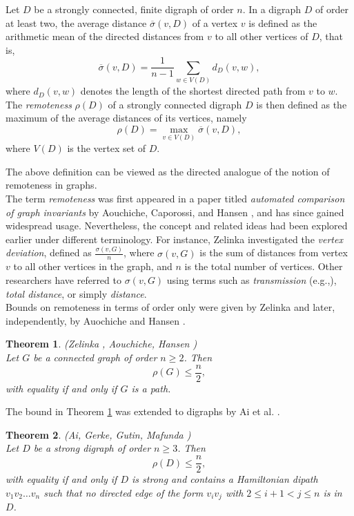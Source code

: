 \documentclass[a4paper,11pt]{article}
\newtheorem{theorem}{Theorem}[section]
\begin{document}
Let $D$ be a strongly connected, finite digraph of order $n$. In a digraph $D$ of order at least two, the average distance $\overline{\sigma}(v, D)$ of a vertex $v$ is defined as the arithmetic mean of the directed distances from $v$ to all other vertices of $D$, that is,
\[
\overline{\sigma}(v, D) = \frac{1}{n-1} \sum_{w \in V(D)} d_D(v, w),
\]
where $d_D(v, w)$ denotes the length of the shortest directed path from $v$ to $w$.  
The \emph{remoteness} $\rho(D)$ of a strongly connected digraph $D$ is then defined as the maximum of the average distances of its vertices, namely
\[
\rho(D) = \max_{v \in V(D)} \overline{\sigma}(v, D),
\]
where $V(D)$ is the vertex set of $D$.  

\medskip
The above definition can be viewed as the directed analogue of the notion of remoteness in graphs.\\


The term \emph{remoteness} was first appeared in a paper titled \emph{automated comparison of graph invariants} by Aouchiche, Caporossi, and Hansen \cite{AouCapHan2007}, and has since gained widespread usage. Nevertheless, the concept and related ideas had been explored earlier under different terminology. For instance, Zelinka \cite{Zel1968} investigated the \emph{vertex deviation}, defined as $\frac{\sigma(v, G)}{n}$, where $\sigma(v, G)$ is the sum of distances from vertex $v$ to all other vertices in the graph, and $n$ is the total number of vertices. Other researchers have referred to $\sigma(v, G)$ using terms such as \emph{transmission} (e.g.,\cite{Ple1984}), \emph{total distance}, or simply \emph{distance}.\\



Bounds on remoteness in terms of order only were given by Zelinka \cite{Zel1968} and later, independently, by Auochiche and Hansen \cite{AouHan2011}. 

\begin{theorem}\label{Zel1968AouHan2011}
{\rm (Zelinka \cite{Zel1968}, Aouchiche, Hansen \cite{AouHan2011})} \\
Let $G$ be a connected graph of order $n\geq 2$. Then
\[ \rho(G) \leq \frac{n}{2}, \]
with equality if and only if $G$ is a path.
\end{theorem}

The bound in Theorem \ref{Zel1968AouHan2011} was extended to digraphs by Ai et al. \cite{AiGerGutMaf2021}.

\begin{theorem}\label{AiGerGutMaf2021}
{\rm (Ai, Gerke, Gutin, Mafunda \cite{AiGerGutMaf2021})}\\
Let $D$ be a strong digraph of order $n\geq 3$. Then 
\[\rho(D)\leq \frac{n}{2},\]
with equality if and only if $D$ is strong and contains a Hamiltonian dipath 
$v_1v_2\dots v_n$ such that no directed edge of the form
$v_iv_j$ with $2\le i+1<j\le n$ is in $D$.
\end{theorem}
\end{document}
